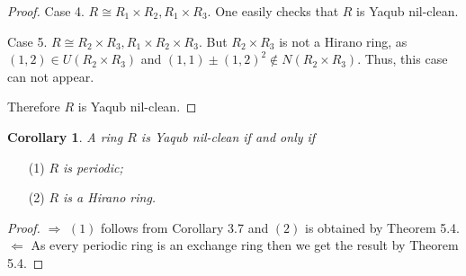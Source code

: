 \documentclass[12pt, reqno]{amsart}
\newtheorem{cor}[thm]{Corollary}
\numberwithin{equation}{section}
\begin{document}
\begin{proof}
Case 4. $R\cong R_1\times R_2, R_1\times R_3$. One easily checks that $R$ is Yaqub nil-clean.

Case 5. $R\cong R_2\times R_3, R_1\times R_2\times R_3$. But $R_2\times R_3$ is not a Hirano ring, as $(1,2)\in U(R_2\times R_3)$ and $(1,1)\pm (1,2)^2\not\in N(R_2\times R_3)$. Thus, this case can not appear.

Therefore $R$ is Yaqub nil-clean.\end{proof}

\begin{cor} A ring $R$ is Yaqub nil-clean if and only if
\end{cor}
\begin{enumerate}
\item [(1)] {\it $R$ is periodic;}
\vspace{-.5mm}
\item [(2)] {\it $R$ is a Hirano ring.}
\end{enumerate}
\begin{proof} $\Longrightarrow$ $(1)$ follows from Corollary 3.7 and $(2)$ is obtained by Theorem 5.4.\\
$\Longleftarrow$  As every periodic ring is an exchange ring then we get the result by Theorem 5.4.\end{proof}
\end{document}
